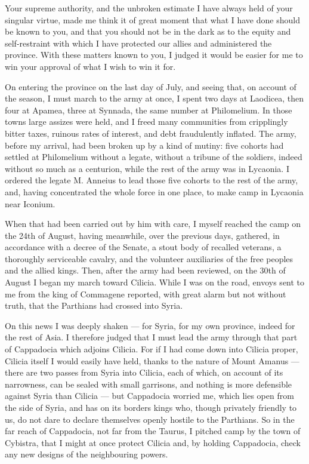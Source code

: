 

 Your supreme authority, and the unbroken estimate I have always held of your singular virtue, made me think it of great moment that what I have done should be known to you, and that you should not be in the dark as to the equity and self-restraint with which I have protected our allies and administered the province. With these matters known to you, I judged it would be easier for me to win your approval of what I wish to win it for.

 On entering the province on the last day of July, and seeing that, on account of the season, I must march to the army at once, I spent two days at Laodicea, then four at Apamea, three at Synnada, the same number at Philomelium. In those towns large assizes were held, and I freed many communities from cripplingly bitter taxes, ruinous rates of interest, and debt fraudulently inflated. The army, before my arrival, had been broken up by a kind of mutiny: five cohorts had settled at Philomelium without a legate, without a tribune of the soldiers, indeed without so much as a centurion, while the rest of the army was in Lycaonia. I ordered the legate M. Anneius to lead those five cohorts to the rest of the army, and, having concentrated the whole force in one place, to make camp in Lycaonia near Iconium.

 When that had been carried out by him with care, I myself reached the camp on the 24th of August, having meanwhile, over the previous days, gathered, in accordance with a decree of the Senate, a stout body of recalled veterans, a thoroughly serviceable cavalry, and the volunteer auxiliaries of the free peoples and the allied kings. Then, after the army had been reviewed, on the 30th of August I began my march toward Cilicia. While I was on the road, envoys sent to me from the king of Commagene reported, with great alarm but not without truth, that the Parthians had crossed into Syria.

 On this news I was deeply shaken --- for Syria, for my own province, indeed for the rest of Asia. I therefore judged that I must lead the army through that part of Cappadocia which adjoins Cilicia. For if I had come down into Cilicia proper, Cilicia itself I would easily have held, thanks to the nature of Mount Amanus --- there are two passes from Syria into Cilicia, each of which, on account of its narrowness, can be sealed with small garrisons, and nothing is more defensible against Syria than Cilicia --- but Cappadocia worried me, which lies open from the side of Syria, and has on its borders kings who, though privately friendly to us, do not dare to declare themselves openly hostile to the Parthians. So in the far reach of Cappadocia, not far from the Taurus, I pitched camp by the town of Cybistra, that I might at once protect Cilicia and, by holding Cappadocia, check any new designs of the neighbouring powers.


